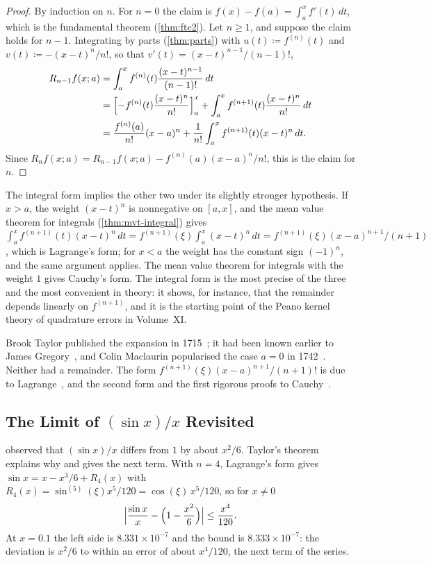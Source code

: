 \begin{proof}
By induction on $n$. For $n=0$ the claim is $f(x)-f(a)=\int_a^xf'(t)\,dt$, which is the fundamental theorem (\cref{thm:ftc2}). Let $n\ge1$, and suppose the claim holds for $n-1$. Integrating by parts (\cref{thm:parts}) with $u(t)\coloneqq f^{(n)}(t)$ and $v(t)\coloneqq-(x-t)^n/n!$, so that $v'(t)=(x-t)^{n-1}/(n-1)!$,
\begin{align*}
R_{n-1}f(x;a)&=\int_a^xf^{(n)}(t)\frac{(x-t)^{n-1}}{(n-1)!}\,dt\\
&=\Bigl[-f^{(n)}(t)\frac{(x-t)^n}{n!}\Bigr]_a^x+\int_a^xf^{(n+1)}(t)\frac{(x-t)^n}{n!}\,dt\\
&=\frac{f^{(n)}(a)}{n!}(x-a)^n+\frac1{n!}\int_a^xf^{(n+1)}(t)(x-t)^n\,dt .
\end{align*}
Since $R_nf(x;a)=R_{n-1}f(x;a)-f^{(n)}(a)(x-a)^n/n!$, this is the claim for $n$.
\end{proof}

The integral form implies the other two under its slightly stronger hypothesis. If $x>a$, the weight $(x-t)^n$ is nonnegative on $[a,x]$, and the mean value theorem for integrals (\cref{thm:mvt-integral}) gives $\int_a^xf^{(n+1)}(t)(x-t)^n\,dt=f^{(n+1)}(\xi)\int_a^x(x-t)^n\,dt=f^{(n+1)}(\xi)(x-a)^{n+1}/(n+1)$, which is Lagrange's form; for $x<a$ the weight has the constant sign $(-1)^n$, and the same argument applies. The mean value theorem for integrals with the weight $1$ gives Cauchy's form. The integral form is the most precise of the three and the most convenient in theory: it shows, for instance, that the remainder depends linearly on $f^{(n+1)}$, and it is the starting point of the Peano kernel theory of quadrature errors in Volume~XI.

Brook Taylor published the expansion in 1715~\cite{taylor1715}; it had been known earlier to James Gregory~\cite{edwards1979}, and Colin Maclaurin popularised the case $a=0$ in 1742~\cite{maclaurin1742}. Neither had a remainder. The form $f^{(n+1)}(\xi)(x-a)^{n+1}/(n+1)!$ is due to Lagrange~\cite{lagrange1797}, and the second form and the first rigorous proofs to Cauchy~\cite{cauchy1823,grabiner1981}.

\subsection{The Limit of \texorpdfstring{$(\sin x)/x$}{sin(x)/x} Revisited}

 observed that $(\sin x)/x$ differs from $1$ by about $x^2/6$. Taylor's theorem explains why and gives the next term. With $n=4$, Lagrange's form gives $\sin x=x-x^3/6+R_4(x)$ with $R_4(x)=\sin^{(5)}(\xi)x^5/120=\cos(\xi)\,x^5/120$, so for $x\ne0$
\[
\Bigl|\frac{\sin x}x-\Bigl(1-\frac{x^2}6\Bigr)\Bigr|\le\frac{x^4}{120} .
\]
At $x=0.1$ the left side is $8.331\times10^{-7}$ and the bound is $8.333\times10^{-7}$: the deviation is $x^2/6$ to within an error of about $x^4/120$, the next term of the series.

